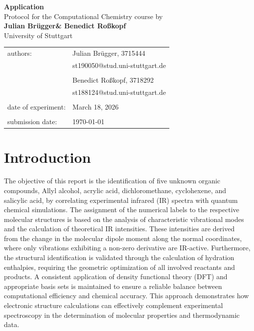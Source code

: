 \documentclass[a4paper,12pt]{scrartcl}
\makeatletter
\newcommand{\VERSUCHSDATUM}{March 18, 2026}
\newcommand{\PROTOKOLLDATUM}{\today}
\newcommand{\VerfasserEINS}{Julian Brügger}
\newcommand{\MatNoEINS}{3715444}
\newcommand{\EmailEINS}{st190050@stud.uni-stuttgart.de}
\newcommand{\VerfasserZWEI}{Benedict Roßkopf}
\newcommand{\MatNoZWEI}{3718292}
\newcommand{\EmailZWEI}{st188124@stud.uni-stuttgart.de}
\newcommand{\VERSUCHSNAME}{Application}
\makeatother
\begin{document}
\begin{titlepage}
\begin{center}
\Huge{\textbf{\VERSUCHSNAME}}\\
\vspace{10mm}
\Large{Protocol for the Computational Chemistry course by \\ \textbf{\VerfasserEINS\;\& \VerfasserZWEI }}\\
\vspace{10mm} 
\Large{University of Stuttgart}\\
\end{center}
\begin{center}
\begin{tabular}{ll}
\large{authors:}        & \large{\VerfasserEINS, \MatNoEINS} \\
                        & \large{\EmailEINS} \\
                        \vspace{2mm}\\
                        & \large{\VerfasserZWEI, \MatNoZWEI} \\
                        & \large{\EmailZWEI} \\						
                        \vspace{0cm}\\
\large{date of experiment:}	& \large{\VERSUCHSDATUM} \\
\vspace{0cm}\\
\large{submission date:} & \large{\PROTOKOLLDATUM}
\end{tabular}
\end{center}
\end{titlepage}

\section{Introduction}

The objective of this report is the identification of five unknown organic compounds, Allyl alcohol, acrylic acid, dichloromethane, cyclohexene, and salicylic acid, by correlating experimental infrared (IR) spectra with quantum chemical simulations. The assignment of the numerical labels to the respective molecular structures is based on the analysis of characteristic vibrational modes and the calculation of theoretical IR intensities. These intensities are derived from the change in the molecular dipole moment along the normal coordinates, where only vibrations exhibiting a non-zero derivative are IR-active. Furthermore, the structural identification is validated through the calculation of hydration enthalpies, requiring the geometric optimization of all involved reactants and products. A consistent application of density functional theory (DFT) and appropriate basis sets is maintained to ensure a reliable balance between computational efficiency and chemical accuracy. This approach demonstrates how electronic structure calculations can effectively complement experimental spectroscopy in the determination of molecular properties and thermodynamic data.
\end{document}

